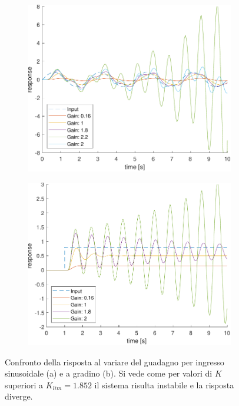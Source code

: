 \begin{figure}[t!]
	\begin{subfigure}{0.5\linewidth}
		\centering
		\includegraphics[width=0.9\linewidth]{../code/pupillary/sine/figs/gainPlot}
		\caption{}
		\label{fig:pup_gain}
	\end{subfigure}\hfill
	\begin{subfigure}{0.5\linewidth}
		\centering
		\includegraphics[width=0.9\linewidth]{../code/pupillary/step/figs/gainPlot}
		\caption{}
		\label{fig:pup_step}
	\end{subfigure}\hfill
	\caption{Confronto della risposta al variare del guadagno per ingresso sinusoidale (a) e a gradino (b). Si vede come per valori di $K$ superiori a $K_{lim}=1.852$ il sistema risulta instabile e la risposta diverge.}
\end{figure}

